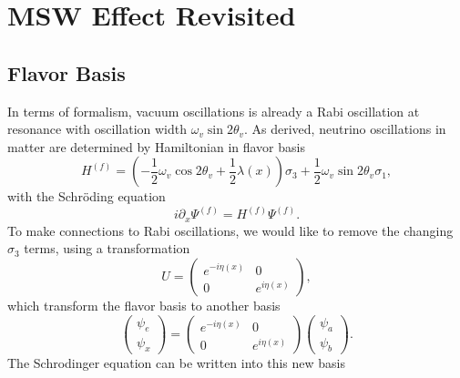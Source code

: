 

\chapter{\label{app:msw-revisited}MSW Effect Revisited}






\section{Flavor Basis}

In terms of formalism, vacuum oscillations is already a Rabi oscillation at resonance with oscillation width $\omega_v \sin 2\theta_v$. As derived, neutrino oscillations in matter are determined by Hamiltonian in flavor basis
\begin{equation}
      H^{(f)} = \left(- \frac{1}{2} \omega_v \cos 2\theta_v +\frac{1}{2}\lambda(x)  \right)\sigma_3 + \frac{1}{2} \omega_v \sin 2\theta_v \sigma_1,
\end{equation}
with the Schr\"{o}ding equation
\begin{equation}
    i \partial_x \Psi^{(f)} = H^{(f)} \Psi^{(f)}.
\end{equation}
To make connections to Rabi oscillations, we would like to remove the changing $\sigma_3$ terms, using a transformation
\begin{equation}
    U = \begin{pmatrix} e^{-i \eta (x)} & 0 \\  0 & e^{i \eta (x)}  \end{pmatrix},
\end{equation}
which transform the flavor basis to another basis
\begin{equation}
    \begin{pmatrix} \psi_e \\ \psi_x \end{pmatrix} = \begin{pmatrix} e^{-i \eta (x)} & 0 \\  0 & e^{i \eta (x)}  \end{pmatrix} \begin{pmatrix} \psi_{a} \\ \psi_{b} \end{pmatrix}.
\end{equation}
The Schrodinger equation can be written into this new basis
